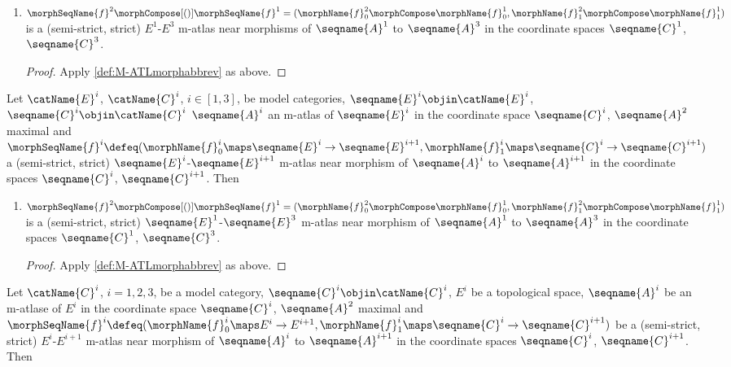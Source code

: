 \documentclass{article}
\begin{document}
\begin{corollary}
\begin{enumerate}[resume]
\item
$
  \morphSeqName{f}^2 \morphCompose[()] \morphSeqName{f}^1 =
    (
      \morphName{f}^2_0 \morphCompose \morphName{f}^1_0,
      \morphName{f}^2_1 \morphCompose \morphName{f}^1_1
    )
$
is a (semi-strict, strict) $E^1$-$E^3$ m-atlas near morphisms of
$\seqname{A}^1$ to $\seqname{A}^3$ in the coordinate spaces
$\seqname{C}^1$, $\seqname{C}^3$.

\begin{proof}
Apply \cref{def:M-ATLmorphabbrev} as above.
\end{proof}
\end{enumerate}

Let $\catName{E}^i$, $\catName{C}^i$, $i \in [1,3]$, be model categories,
$\seqname{E}^i \objin \catName{E}^i$,
$\seqname{C}^i \objin \catName{C}^i$ $\seqname{A}^i$ an m-atlas
of $\seqname{E}^i$ in the coordinate space $\seqname{C}^i$,
$\seqname{A}^2$ maximal and
$
  \morphSeqName{f}^i \defeq \\
  (
    \morphName{f}^i_0 \maps \seqname{E}^i \to \seqname{E}^{i+1},
    \morphName{f}^i_1 \maps \seqname{C}^i \to \seqname{C}^{i+1}
  )
$
a (semi-strict, strict) $\seqname{E}^i$-$\seqname{E}^{i+1}$ m-atlas near
morphism of $\seqname{A}^i$ to $\seqname{A}^{i+1}$ in the coordinate
spaces $\seqname{C}^i$, $\seqname{C}^{i+1}$. Then

\begin{enumerate}[resume]
\item
$
  \morphSeqName{f}^2 \morphCompose[()] \morphSeqName{f}^1 =
  (
    \morphName{f}^2_0 \morphCompose \morphName{f}^1_0,
    \morphName{f}^2_1 \morphCompose \morphName{f}^1_1
  )
$
is a (semi-strict, strict) $\seqname{E}^1$-$\seqname{E}^3$ m-atlas near
morphism of $\seqname{A}^1$ to $\seqname{A}^3$ in the coordinate spaces
$\seqname{C}^1$, $\seqname{C}^3$.

\begin{proof}
Apply \cref{def:M-ATLmorphabbrev} as above.
\end{proof}
\end{enumerate}

Let $\catName{C}^i$, $i=1,2,3$, be a model category,
$\seqname{C}^i \objin \catName{C}^i$, $E^i$ be a topological space,
$\seqname{A}^i$ be an m-atlase of $E^i$ in the coordinate space
$\seqname{C}^i$,
$\seqname{A}^2$ maximal and
$
  \morphSeqName{f}^i \defeq \\*
  (
    \morphName{f}^i_0 \maps E^i \to E^{i+1},
    \morphName{f}^i_1 \maps \seqname{C}^i \to \seqname{C}^{i+1}
  )
$
be a (semi-strict, strict) $E^i$-$E^{i+1}$ m-atlas near morphism of
$\seqname{A}^i$ to $\seqname{A}^{i+1}$ in the coordinate spaces
$\seqname{C}^i$, $\seqname{C}^{i+1}$. Then


\end{corollary}
\end{document}
